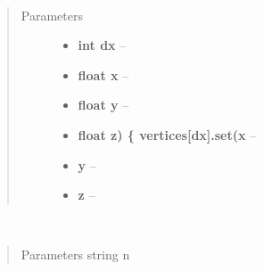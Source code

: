 \documentclass[letterpaper,10pt,english]{sphinxmanual}
\begin{document}

\begin{fulllineitems}
\label{gl:VertexData::setVertex__i.float.float.float}~\begin{quote}\begin{description}
\item[{Parameters}] \leavevmode\begin{itemize}
\item {} 
\textbf{int dx} -- 

\item {} 
\textbf{float x} -- 

\item {} 
\textbf{float y} -- 

\item {} 
\textbf{float z) \{ vertices{[}dx{]}.set(x} -- 

\item {} 
\textbf{y} -- 

\item {} 
\textbf{z} -- 

\end{itemize}

\end{description}\end{quote}

\end{fulllineitems}


\begin{fulllineitems}
\label{gl:VertexData::setName__string}~\begin{quote}\begin{description}
\item[{Parameters string n}] \leavevmode


\end{description}\end{quote}

\end{fulllineitems}


\begin{fulllineitems}
\label{gl:VertexData::getName}
\end{fulllineitems}
\end{document}
